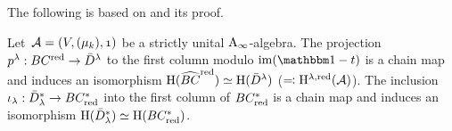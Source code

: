 \documentclass[\MainFolder/Text.tex]{subfiles}
\begin{document}
The following is based on \cite[Proposition 2.2.14]{LodayCyclic} and its proof.

\begin{Lemma} \label{Lem:ReducedCyclic}
Let~$\Alg=(V,(\mu_k),\NOne)$ be a strictly unital $\mathrm{A}_\infty$-algebra. The projection $p^\lambda: BC^{\mathrm{red}} \rightarrow \bar{D}^\lambda$ to the first column modulo $\im(\Id-\CycPermOp)$ is a chain map and induces an isomorphism $\mathrm{H}(\widehat{BC}^{\mathrm{red}})\simeq\mathrm{H}(\bar{D}^\lambda)$ ($\eqqcolon\mathrm{H}^{\lambda,\mathrm{red}}(\mathcal{A})$). The inclusion $\iota_\lambda: \bar{D}_\lambda^* \rightarrow BC_{\mathrm{red}}^*$ into the first column of $BC_{\mathrm{red}}^*$ is a chain map and induces an isomorphism $\mathrm{H}(\bar{D}_\lambda^*)\simeq\mathrm{H}(BC_{\mathrm{red}}^*)$. 
\end{Lemma}
\end{document}
